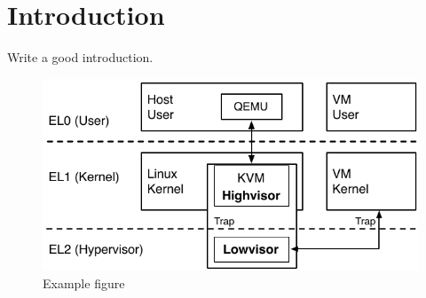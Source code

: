 \section{Introduction}
\label{sec:intro}

Write a good introduction.

\begin{figure}[h]
   \centering
   \includegraphics[width=\columnwidth{}]{figures/example}
   \caption{Example figure}\label{fig:example}
\end{figure}
